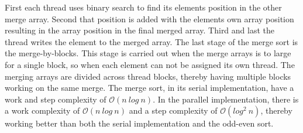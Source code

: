 First each thread uses binary search to find its elements position in the other merge array. Second that position is added with the elements own array position resulting in the array position in the final merged array. Third and last the thread writes the element to the merged array. The last stage of the merge sort is the merge-by-blocks. This stage is carried out when the merge arrays is to large for a single block, so when each element can not be assigned its own thread. The merging arrays are divided across thread blocks, thereby having multiple blocks working on the same merge. The merge sort, in its serial implementation, have a work and step complexity of $\mathcal{O}(n~log~n)$. In the parallel implementation, there is a work complexity of $\mathcal{O}(n~log~n)$ and a step complexity of $\mathcal{O}(log^2~n)$, thereby working better than both the serial implementation and the odd-even sort.  